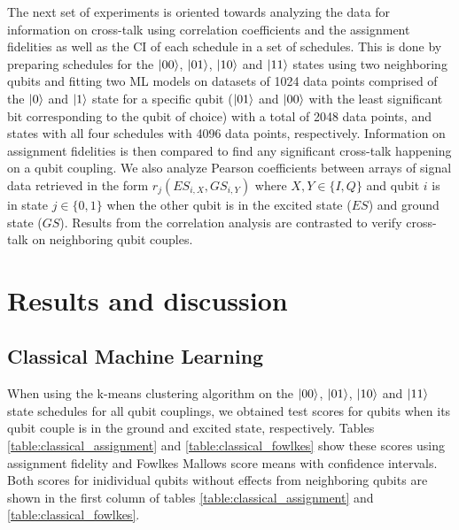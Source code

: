 \documentclass[conference]{IEEEtran}
\begin{document}
The next set of experiments is oriented towards analyzing the data for information on cross-talk using correlation coefficients and the assignment fidelities as well as the CI of each schedule in a set of schedules. This is done by preparing schedules for the \(\ket{00}\), \(\ket{01}\), \(\ket{10}\) and \(\ket{11}\) states using two neighboring qubits and fitting two ML models on datasets of 1024 data points comprised of the \(\ket{0}\) and \(\ket{1}\) state for a specific qubit (\(\ket{01}\) and \(\ket{00}\) with the least significant bit corresponding to the qubit of choice) with a total of 2048 data points, and states with all four schedules with 4096 data points, respectively. Information on assignment fidelities is then compared to find any significant cross-talk happening on a qubit coupling. We also analyze Pearson coefficients between arrays of signal data retrieved in the form $ r_j(ES_{i,X}, GS_{i,Y}) $ where $ X,Y \in \{I,Q\} $ and qubit $ i $ is in state $ j \in \{0,1\} $ when the other qubit is in the excited state ($ ES $) and ground state ($ GS $). Results from the correlation analysis are contrasted to verify cross-talk on neighboring qubit couples.

\section{Results and discussion}

\subsection{Classical Machine Learning}

When using the k-means clustering algorithm on the \(\ket{00}\), \(\ket{01}\), \(\ket{10}\) and \(\ket{11}\) state schedules for all qubit couplings, we obtained test scores for qubits when its qubit couple is in the ground and excited state, respectively. Tables \ref{table:classical_assignment} and \ref{table:classical_fowlkes} show these scores using assignment fidelity and Fowlkes Mallows score means with confidence intervals. Both scores for inidividual qubits without effects from neighboring qubits are shown in the first column of tables \ref{table:classical_assignment} and \ref{table:classical_fowlkes}.
\end{document}
